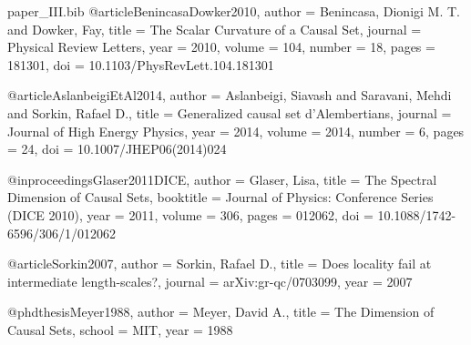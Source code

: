 
\begin{filecontents*}{paper_III.bib}
@article{BenincasaDowker2010,
  author  = {Benincasa, Dionigi M. T. and Dowker, Fay},
  title   = {The Scalar Curvature of a Causal Set},
  journal = {Physical Review Letters},
  year    = {2010},
  volume  = {104},
  number  = {18},
  pages   = {181301},
  doi     = {10.1103/PhysRevLett.104.181301}
}

@article{AslanbeigiEtAl2014,
  author  = {Aslanbeigi, Siavash and Saravani, Mehdi and Sorkin, Rafael D.},
  title   = {Generalized causal set d'Alembertians},
  journal = {Journal of High Energy Physics},
  year    = {2014},
  volume  = {2014},
  number  = {6},
  pages   = {24},
  doi     = {10.1007/JHEP06(2014)024}
}

@inproceedings{Glaser2011DICE,
  author    = {Glaser, Lisa},
  title     = {The Spectral Dimension of Causal Sets},
  booktitle = {Journal of Physics: Conference Series (DICE 2010)},
  year      = {2011},
  volume    = {306},
  pages     = {012062},
  doi       = {10.1088/1742-6596/306/1/012062}
}

@article{Sorkin2007,
  author  = {Sorkin, Rafael D.},
  title   = {Does locality fail at intermediate length-scales?},
  journal = {arXiv:gr-qc/0703099},
  year    = {2007}
}

@phdthesis{Meyer1988,
  author  = {Meyer, David A.},
  title   = {The Dimension of Causal Sets},
  school  = {MIT},
  year    = {1988}
}
\end{filecontents*}

\documentclass[11pt]{article}

\usepackage[margin=1in]{geometry}
\usepackage{amsmath,amssymb,amsthm,mathtools}
\usepackage{graphicx}
\usepackage{hyperref}
\usepackage{microtype}
\usepackage[numbers,sort&compress]{natbib}
\usepackage{xcolor}
\usepackage{float}                %
\usepackage[section]{placeins}    %

\hypersetup{
  colorlinks=true,
  linkcolor=blue!50!black,
  citecolor=blue!50!black,
  urlcolor=blue!50!black
}

\theoremstyle{plain}
\newtheorem{theorem}{Theorem}
\newtheorem{proposition}[theorem]{Proposition}
\theoremstyle{definition}
\newtheorem{definition}[theorem]{Definition}
\theoremstyle{remark}
\newtheorem{remark}[theorem]{Remark}

